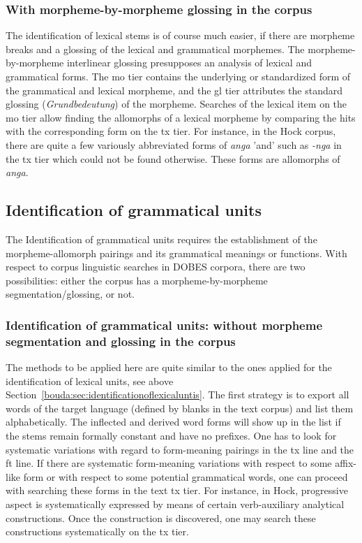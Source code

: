 \subsubsection{With morpheme-by-morpheme glossing in the corpus}
\label{bouda:sec:morphmebymorphemeglossing}
The identification of lexical stems is of course much easier, if there are morpheme breaks and a glossing of the lexical and grammatical morphemes. The morpheme-by-morpheme interlinear glossing presupposes an analysis of lexical and grammatical forms. The mo tier contains the underlying or standardized form of the grammatical and lexical morpheme, and the gl tier attributes the standard glossing (\textit{Grundbedeutung}) of the morpheme. Searches of the lexical item on the mo tier allow finding the allomorphs of a lexical morpheme by comparing the hits with the corresponding form on the tx tier. For instance, in the Hoc{\A}k corpus, there are quite a few variously abbreviated forms of \textit{an{\A}ga} 'and' such as \textit{-n{\A}ga} in the tx tier which could not be found otherwise. These forms are allomorphs of \textit{an{\A}ga}.

\subsection{Identification of grammatical units}

The Identification of grammatical units requires the establishment of the morpheme-allomorph pairings and its grammatical meanings or functions. With respect to corpus linguistic searches in DOBES corpora, there are two possibilities: either the corpus has a morpheme-by-morpheme segmentation/glossing, or not. 

\subsubsection{Identification of grammatical units: without morpheme segmentation and glossing in the corpus}
The methods to be applied here are quite similar to the ones applied for the identification of lexical units, see above Section\ \ref{bouda:sec:identificationoflexicaluntis}. The first strategy is to export all words of the target language (defined by blanks in the text corpus) and list them alphabetically. The inflected and derived word forms will show up in the list if the stems remain formally constant and have no prefixes. One has to look for systematic variations with regard to form-meaning pairings in the tx line and the ft line. If there are systematic form-meaning variations with respect to some affix-like form or with respect to some potential grammatical words, one can proceed with searching these forms in the text tx tier. For instance, in Hoc{\A}k, progressive aspect is systematically expressed by means of certain verb-auxiliary analytical constructions. Once the construction is discovered, one may search these constructions systematically on the tx tier.

